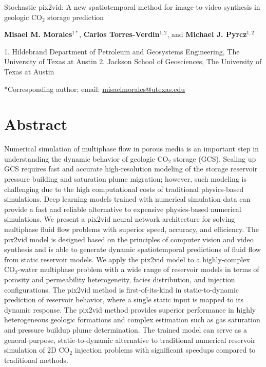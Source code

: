 \documentclass[10pt, twoside]{article}
\begin{document}
\doublespacing

\begin{center}
    {\huge Stochastic pix2vid: A new spatiotemporal method for image-to-video synthesis in geologic CO$_2$ storage prediction}
    \vspace{5mm}
    
    \textbf{Misael M. Morales$^{1*}$}, 
    \textbf{Carlos Torres-Verdin$^{1,2}$}, and
    \textbf{Michael J. Pyrcz$^{1,2}$}
\end{center}

\begin{flushleft}
    1. Hildebrand Department of Petroleum and Geosystems Engineering, The University of Texas at Austin
    2. Jackson School of Geosciences, The University of Texas at Austin
    
    *Corresponding author; email: \url{misaelmorales@utexas.edu}
\end{flushleft}

\section*{\textbf{Abstract}}
Numerical simulation of multiphase flow in porous media is an important step in understanding the dynamic behavior of geologic CO$_2$ storage (GCS). Scaling up GCS requires fast and accurate high-resolution modeling of the storage reservoir pressure building and saturation plume migration; however, such modeling is challenging due to the high computational costs of traditional physics-based simulations.  Deep learning models trained with numerical simulation data can provide a fast and reliable alternative to expensive physics-based numerical simulations. We present a pix2vid neural network architecture for solving multiphase fluid flow problems with superior speed, accuracy, and efficiency. The pix2vid model is designed based on the principles of computer vision and video synthesis and is able to generate dynamic spatiotemporal predictions of fluid flow from static reservoir models. We apply the pix2vid model to a highly-complex CO$_2$-water multiphase problem with a wide range of reservoir models in terms of porosity and permeability heterogeneity, facies distribution, and injection configurations. The pix2vid method is first-of-its-kind in static-to-dynamic prediction of reservoir behavior, where a single static input is mapped to its dynamic response. The pix2vid method provides superior performance in highly heterogeneous geologic formations and complex estimation such as gas saturation and pressure buildup plume determination. The trained model can serve as a general-purpose, static-to-dynamic alternative to traditional numerical reservoir simulation of 2D CO$_2$ injection problems with significant speedups compared to traditional methods.
\end{document}

